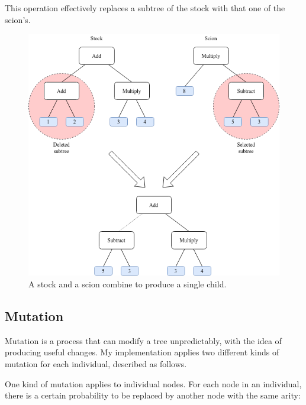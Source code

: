 \documentclass{report}
\begin{document}
This operation effectively replaces a subtree of the stock with that one of the scion's.

\begin{figure}[ht]
    \centering
    \includegraphics[scale=0.60]{crossover}
    \caption{A stock and a scion combine to produce a single child.}
\end{figure}

\subsection{Mutation}

Mutation is a process that can modify a tree unpredictably, with the idea of producing useful changes. My implementation applies two different kinds of mutation for each individual, described as follows.

One kind of mutation applies to individual nodes. For each node in an individual, there is a certain probability to be replaced by another node with the same arity:
\end{document}

